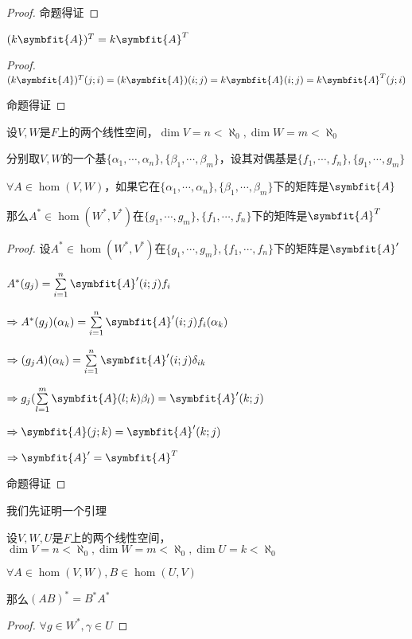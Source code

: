 \documentclass[12pt, a4paper, oneside, UTF8]{ctexbook}
\begin{document}
\begin{para}{0}
\begin{proof}
						命题得证
					\end{proof}
				\point{}
					\begin{proposition}
						$(k\symbfit{A})^T = k\symbfit{A}^T$
					\end{proposition}
					\begin{proof}
						$(k\symbfit{A})^T(j;i)=(k\symbfit{A})(i;j)=k\symbfit{A}(i;j) = k\symbfit{A}^T(j;i)$

						命题得证
					\end{proof}
				\point{}
					\begin{proposition}
						设$V,W$是$F$上的两个线性空间，$\dim V = n < \aleph_0,\dim W = m < \aleph_0$

						分别取$V,W$的一个基$\{\alpha_1,\cdots,\alpha_n\},\{\beta_1,\cdots,\beta_m\}$，设其对偶基是$\{f_1,\cdots,f_n\},\{g_1,\cdots,g_m\}$

						$\forall A \in \hom(V,W)$，如果它在$\{\alpha_1,\cdots,\alpha_n\},\{\beta_1,\cdots,\beta_m\}$下的矩阵是$\symbfit{A}$

						那么$A^* \in \hom(W^*,V^*)$在$\{g_1,\cdots,g_m\},\{f_1,\cdots,f_n\}$下的矩阵是$\symbfit{A}^T$
					\end{proposition}
					\begin{proof}
						设$A^* \in \hom(W^*,V^*)$在$\{g_1,\cdots,g_m\},\{f_1,\cdots,f_n\}$下的矩阵是$\symbfit{A}'$

						$A^*(g_j)=\sum\limits_{i=1}^{n} \symbfit{A}'(i;j) f_i$

						$\Rightarrow A^*(g_j)(\alpha_k)=\sum\limits_{i=1}^{n} \symbfit{A}'(i;j) f_i(\alpha_k)$

						$\Rightarrow (g_jA)(\alpha_k)=\sum\limits_{i=1}^{n} \symbfit{A}'(i;j) \delta_{ik}$

						$\Rightarrow g_j(\sum\limits_{l=1}^{m} \symbfit{A}(l;k) \beta_l)=\symbfit{A}'(k;j)$

						$\Rightarrow \symbfit{A}(j;k)=\symbfit{A}'(k;j)$

						$\Rightarrow \symbfit{A}'=\symbfit{A}^T$

						命题得证
					\end{proof}
				\point{}
					我们先证明一个引理
					\begin{lemma}{}{}
						设$V,W,U$是$F$上的两个线性空间，$\dim V = n < \aleph_0,\dim W = m < \aleph_0,\dim U = k < \aleph_0$

						$\forall A \in \hom(V,W),B \in \hom(U,V)$

						那么$(AB)^*=B^*A^*$
					\end{lemma}
					\begin{proof}
						$\forall g \in W^*,\gamma \in U$


\end{proof}
\end{para}
\end{document}
